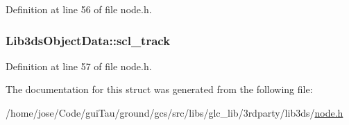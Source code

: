 Definition at line 56 of file node.\-h.

\hypertarget{struct_lib3ds_object_data_a94c6fd9ad997abe5bc5dd98a84be1353}{
\subsubsection[{scl\-\_\-track}]{ Lib3ds\-Object\-Data\-::scl\-\_\-track}}\label{struct_lib3ds_object_data_a94c6fd9ad997abe5bc5dd98a84be1353}


Definition at line 57 of file node.\-h.



The documentation for this struct was generated from the following file\-:\begin{DoxyCompactItemize}
\item 
/home/jose/\-Code/gui\-Tau/ground/gcs/src/libs/glc\-\_\-lib/3rdparty/lib3ds/\hyperlink{node_8h}{node.\-h}\end{DoxyCompactItemize}
